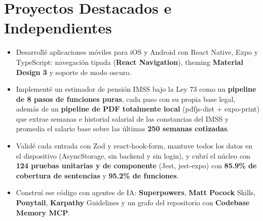 {\section*{Proyectos Destacados e Independientes}

\begin{itemize}
    \item Desarrollé aplicaciones móviles para iOS y Android con React Native, Expo y TypeScript: navegación tipada (\textbf{React Navigation}), theming \textbf{Material Design 3} y soporte de modo oscuro.
    \item Implementé un estimador de pensión IMSS bajo la Ley 73 como un \textbf{pipeline de 8 pasos de funciones puras}, cada paso con su propia base legal, además de un \textbf{pipeline de PDF totalmente local} (pdfjs-dist + expo-print) que extrae semanas e historial salarial de las constancias del IMSS y promedia el salario base sobre las últimas \textbf{250 semanas cotizadas}.
    \item Validé cada entrada con Zod y react-hook-form, mantuve todos los datos en el dispositivo (AsyncStorage, sin backend y sin login), y cubrí el núcleo con \textbf{124 pruebas unitarias y de componente} (Jest, jest-expo) con \textbf{85.9\% de cobertura de sentencias} y \textbf{95.2\% de funciones}.
    \item Construí ese código con agentes de IA: \textbf{Superpowers}, \textbf{Matt Pocock} Skills, \textbf{Ponytail}, \textbf{Karpathy} Guidelines y un grafo del repositorio con \textbf{Codebase Memory MCP}.
\end{itemize}

}
